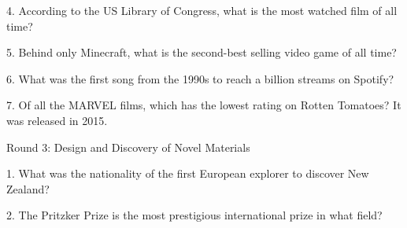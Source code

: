 \begin{frame}
\begin{center}
\Large
4. According to the US Library of Congress, what is the most watched film of all time?
\\
\end{center}
\end{frame}
\begin{frame}
\begin{center}
\Large
5. Behind only Minecraft, what is the second-best selling video game of all time?
\\
\end{center}
\end{frame}
\begin{frame}
\begin{center}
\Large
6. What was the first song from the 1990s to reach a billion streams on Spotify?
\\
\end{center}
\end{frame}
\begin{frame}
\begin{center}
\Large
7. Of all the MARVEL films, which has the lowest rating on Rotten Tomatoes? It was released in 2015.
\\
\end{center}
\end{frame}
\begin{frame}
\begin{center}
\Huge
Round 3: Design and Discovery of Novel Materials
\end{center}
\end{frame}
\begin{frame}
\begin{center}
\Large
1. What was the nationality of the first European explorer to discover New Zealand?
\end{center}
\end{frame}
\begin{frame}
\begin{center}
\Large
2. The Pritzker Prize is the most prestigious international prize in what field?
\end{center}
\end{frame}
